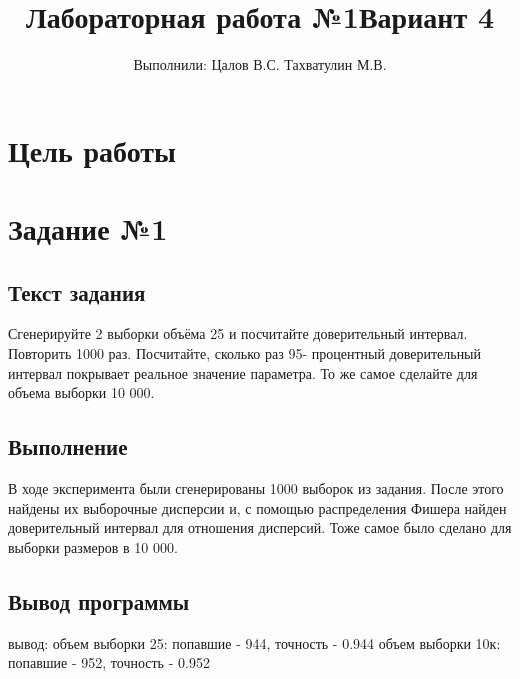 \documentclass{article}
\title{Лабораторная работа №1}
\author{Выполнили: Цалов В.С. Тахватулин М.В.}
\begin{document}
\section{Цель работы}
\title{Вариант 4}

\section{Задание №1}\label{sec:-no1}
\subsection{Текст задания}
Сгенерируйте 2 выборки объёма 25 и посчитайте доверительный интервал. Повторить 1000 раз. Посчитайте, сколько раз 95-
процентный доверительный интервал покрывает реальное значение параметра. То же самое
сделайте для объема выборки 10 000.

\subsection{Выполнение}
В ходе эксперимента были сгенерированы 1000 выборок из задания. 
После этого найдены их выборочные дисперсии и, с помощью распределения Фишера найден доверительный интервал для отношения дисперсий.
Тоже самое было сделано для выборки размеров в 10 000. 

\subsection{Вывод программы}
вывод:\newline
объем выборки 25:\newline
попавшие - 944, точность - 0.944\newline
объем выборки 10к:\newline
попавшие - 952, точность - 0.952
\end{document}
